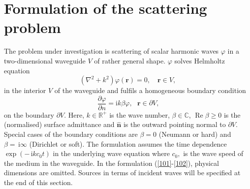 \documentclass[numreferences]{kluwer}
\renewcommand{\phi}{\varphi}
\renewcommand{\Re}{\operatorname{Re}}
\renewcommand{\i}{\,\mathrm{i}}
\begin{document}


\section{Formulation of the scattering problem}
\label{sec:prel}


The problem under investigation is scattering of scalar harmonic waves
$\phi$ in a two-dimensional waveguide $V$ of rather general
shape. $\phi$ solves Helmholtz equation%
\begin{equation}
  (\nabla^{2}+k^{2})\phi(\bm{r})=0,\quad\bm{r}\in V, \label{101}%
\end{equation}
in the interior $V$ of the waveguide and fulfils a homogeneous
boundary condition%
\begin{equation}
  \dfrac{\partial \phi}{\partial n}=\text{i}k\beta \phi,
  \text{ }\bm{r}\in\partial V\text{,} \label{102}%
\end{equation}
on the boundary $\partial V$. Here, $k\in\mathbb{R}^{+}$ is the wave
number, $\beta\in\mathbb{C}$, $\Re\beta\geq0$ is the (normalised)
surface admittance and $\widehat{\bm{n}}$ is the outward pointing
normal to $\partial V$. Special cases of the boundary conditions are
$\beta=0$ (Neumann or hard) and $\beta=\i\infty$ (Dirichlet or
soft). The formulation assumes the time dependence $\exp(-\i kc_{0}t)$
in the underlying wave equation where $c_{0},$ is the wave speed of
the medium in the waveguide.
In the formulation (\ref{101}-\ref{102}), physical dimensions are
omitted.
Sources in terms of incident waves will
be specified at the end of this section.
\end{document}

